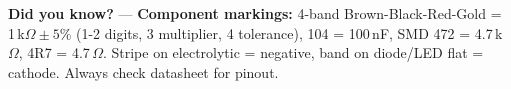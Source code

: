 \begin{tcolorbox}[
  colback=SoftYellow,
  colframe=IEEEblue!70!black,
  boxrule=0.5pt,
  arc=0mm,
  left=3mm, right=3mm, top=2mm, bottom=2mm
]
\small\RaggedRight \textbf{\color{IEEEblue!75!black}Did you know?} — \textbf{Component markings:} 4-band Brown-Black-Red-Gold = 1\,k$\Omega\pm5\%$ (1-2 digits, 3 multiplier, 4 tolerance), 104 = 100\,nF, SMD 472 = 4.7\,k$\Omega$, 4R7 = 4.7\,$\Omega$. Stripe on electrolytic = negative, band on diode/LED flat = cathode. Always check datasheet for pinout.
\end{tcolorbox}
